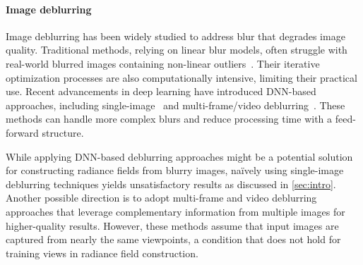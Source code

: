 \paragraph{Image deblurring}
Image deblurring has been widely studied to address blur that degrades image quality. 
Traditional methods, relying on linear blur models, often struggle with real-world blurred images containing non-linear outliers~\cite{cho2009fast, hirsch2011fast, zhang2013non, pan2014deblurring, whyte10nonuniform, cho2012video, cho2007removing, rav2005two}. 
Their iterative optimization processes are also computationally intensive, limiting their practical use. 
Recent advancements in deep learning have introduced DNN-based approaches, including single-image~\cite{nah2017gopro, tao2018srn, kupyn2018deblurgan, zamir2021mprnet, cho2021mimounet, chen2022nafnet} and multi-frame/video deblurring~\cite{wieschollek2017learning, aittala2018burst, zhou2019davanet, gu2020blur, su2017video, nah2019video, deng2021video, hyun2017video, zhou2019video}. 
These methods can handle more complex blurs and reduce processing time with a feed-forward structure.

While applying DNN-based deblurring approaches might be a potential solution for constructing radiance fields from blurry images, na\"ively using single-image deblurring techniques yields unsatisfactory results as discussed in \cref{sec:intro}. 
Another possible direction is to adopt multi-frame and video deblurring approaches that leverage complementary information from multiple images for higher-quality results.
However, these methods assume that input images are captured from nearly the same viewpoints, a condition that does not hold for training views in radiance field construction.
